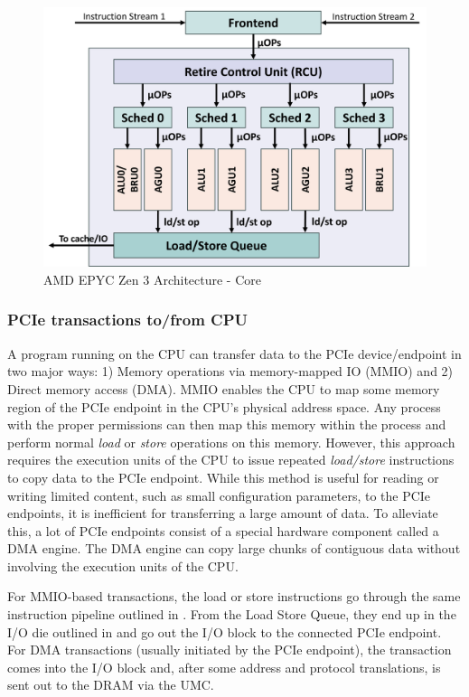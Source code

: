 \begin{figure}[!htb]
    \centering
    \includegraphics[width=\columnwidth]{figures/background/amd_arch/core.png}
    \caption{AMD EPYC Zen 3 Architecture - Core}
    \label{fig:amd-core}
\end{figure}

\subsubsection{PCIe transactions to/from CPU}

A program running on the CPU can transfer data to the PCIe device/endpoint in two major ways: 1) Memory operations via memory-mapped IO (MMIO) and 2) Direct memory access (DMA).
MMIO enables the CPU to map some memory region of the PCIe endpoint in the CPU's physical address space.
Any process with the proper permissions can then map this memory within the process and perform normal \textit{load} or \textit{store} operations on this memory.
However, this approach requires the execution units of the CPU to issue repeated \textit{load/store} instructions to copy data to the PCIe endpoint.
While this method is useful for reading or writing limited content, such as small configuration parameters, to the PCIe endpoints, it is inefficient for transferring a large amount of data.
To alleviate this, a lot of PCIe endpoints consist of a special hardware component called a DMA engine.
The DMA engine can copy large chunks of contiguous data without involving the execution units of the CPU.

For MMIO-based transactions, the load or store instructions go through the same instruction pipeline outlined in . 
From the Load Store Queue, they end up in the I/O die outlined in  and go out the I/O block to the connected PCIe endpoint.
For DMA transactions (usually initiated by the PCIe endpoint), the transaction comes into the I/O block and, after some address and protocol translations, is sent out to the DRAM via the UMC.

\endinput

